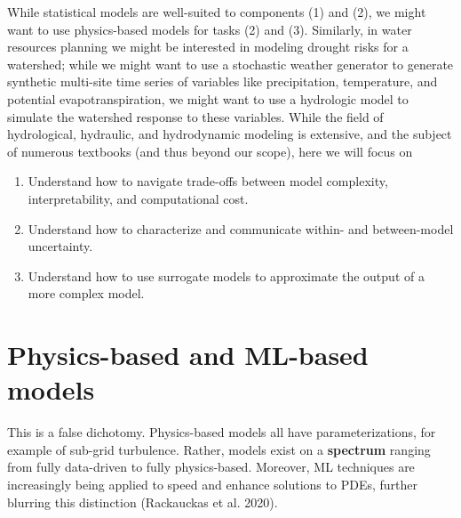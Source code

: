 \documentclass[
  letterpaper,
  DIV=11,
  numbers=noendperiod]{scrreprt}
\providecommand{\tightlist}{%
  \setlength{\itemsep}{0pt}\setlength{\parskip}{0pt}}
\begin{document}
While statistical models are well-suited to components (1) and (2), we
might want to use physics-based models for tasks (2) and (3). Similarly,
in water resources planning we might be interested in modeling drought
risks for a watershed; while we might want to use a stochastic weather
generator to generate synthetic multi-site time series of variables like
precipitation, temperature, and potential evapotranspiration, we might
want to use a hydrologic model to simulate the watershed response to
these variables. While the field of hydrological, hydraulic, and
hydrodynamic modeling is extensive, and the subject of numerous
textbooks (and thus beyond our scope), here we will focus on

\begin{tcolorbox}[enhanced jigsaw, arc=.35mm, breakable, title=\textcolor{quarto-callout-tip-color}{\faLightbulb}\hspace{0.5em}{Learning objectives}, coltitle=black, opacityback=0, bottomtitle=1mm, colback=white, left=2mm, opacitybacktitle=0.6, toptitle=1mm, colframe=quarto-callout-tip-color-frame, leftrule=.75mm, titlerule=0mm, rightrule=.15mm, bottomrule=.15mm, colbacktitle=quarto-callout-tip-color!10!white, toprule=.15mm]

\begin{enumerate}
\def\labelenumi{\arabic{enumi}.}
\tightlist
\item
  Understand how to navigate trade-offs between model complexity,
  interpretability, and computational cost.
\item
  Understand how to characterize and communicate within- and
  between-model uncertainty.
\item
  Understand how to use surrogate models to approximate the output of a
  more complex model.
\end{enumerate}

\end{tcolorbox}

\section{Physics-based and ML-based
models}\label{physics-based-and-ml-based-models}

This is a false dichotomy. Physics-based models all have
parameterizations, for example of sub-grid turbulence. Rather, models
exist on a \textbf{spectrum} ranging from fully data-driven to fully
physics-based. Moreover, ML techniques are increasingly being applied to
speed and enhance solutions to PDEs, further blurring this distinction
(Rackauckas et al. 2020).
\end{document}
